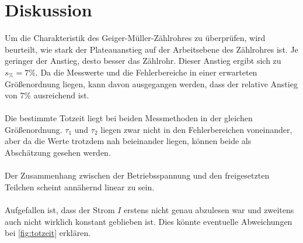 \section{Diskussion}
\label{sec:Diskussion}

Um die Charakteristik des Geiger-Müller-Zählrohres zu überprüfen, wird beurteilt, wie stark 
der Plateauanstieg auf der Arbeitsebene des Zählrohres ist. Je geringer der Anstieg, desto besser das Zählrohr.
Dieser Anstieg ergibt sich zu $s_{\%} = 7\%$. Da die Messwerte und die Fehlerbereiche in einer erwarteten Größenordnung liegen, kann davon ausgegangen werden,
dass der relative Anstieg von $7\%$ ausreichend ist.
\\
\\
Die bestimmte Totzeit liegt bei beiden Messmethoden in der gleichen Größenordnung. 
$\tau_1$ und $\tau_2$ liegen zwar nicht in den Fehlerbereichen voneinander, aber da die Werte trotzdem
nah beieinander liegen, können beide als Abschätzung gesehen werden.
\\
\\
Der Zusammenhang zwischen der Betriebsspannung und den freigesetzten Teilchen scheint annähernd linear zu sein.
\\
\\
Aufgefallen ist, dass der Strom $I$ erstens nicht genau abzulesen war und zweitens auch nicht
wirklich konstant geblieben ist. Dies könnte eventuelle Abweichungen bei \autoref{fig:totzeit} erklären.
